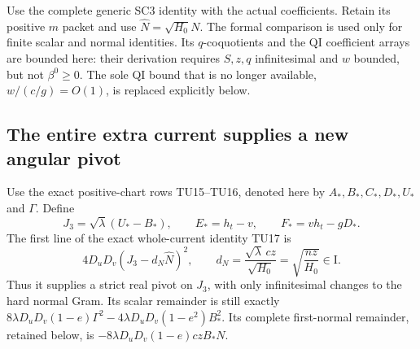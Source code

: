 Use the complete generic SC3 identity with the actual coefficients.
Retain its positive $m$ packet and use $\widehat N=\sqrt{H_0}N$.
The formal comparison is used only for finite scalar and normal
identities. Its $q$-coquotients and the QI coefficient arrays are
bounded here: their derivation requires $S,z,q$ infinitesimal and
$w$ bounded, but not $\beta^0\geq0$. The sole QI bound that is no
longer available, $w/(c/g)=O(1)$, is replaced explicitly below.

\subsection{The entire extra current supplies a new angular pivot}

Use the exact positive-chart rows TU15--TU16, denoted here by
$A_*,B_*,C_*,D_*,U_*$ and $\Gamma$. Define
\[
 J_3=\sqrt\lambda(U_*-B_*),\qquad
 E_*=h_t-v,\qquad F_*=vh_t-gD_*.
                                                               \tag{UL4}
\]
The first line of the exact whole-current identity TU17 is
\[
 4D_uD_v\left(J_3-d_N\widehat N\right)^2,\qquad
 d_N=\frac{\sqrt\lambda\,cz}{\sqrt{H_0}}
       =\sqrt{\frac{nz}{H_0}}\in\mathrm I.                       \tag{UL5}
\]
Thus it supplies a strict real pivot on $J_3$, with only
infinitesimal changes to the hard normal Gram. Its scalar
remainder is still exactly
$8\lambda D_uD_v(1-e)\Gamma^2
-4\lambda D_uD_v(1-e^2)B_*^2$.
Its complete first-normal remainder, retained below, is
$-8\lambda D_uD_v(1-e)czB_*N$.

